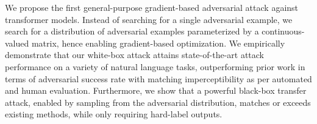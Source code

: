 We propose the first general-purpose gradient-based adversarial attack against transformer models. Instead of searching for a single adversarial example, we search for a distribution of adversarial examples parameterized by a continuous-valued matrix, hence enabling gradient-based optimization. We empirically demonstrate that our white-box attack attains state-of-the-art attack performance on a variety of natural language tasks, outperforming prior work in terms of adversarial success rate with matching imperceptibility as per automated and human evaluation. Furthermore, we show that a powerful black-box transfer attack, enabled by sampling from the adversarial distribution, matches or exceeds existing methods, while only requiring hard-label outputs.
